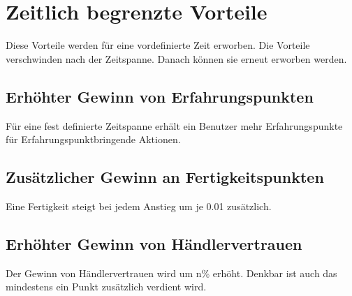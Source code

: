 \chapter{Zeitlich begrenzte Vorteile}
Diese Vorteile werden f{\"u}r eine vordefinierte Zeit erworben. Die Vorteile
verschwinden nach der Zeitspanne. Danach k{\"o}nnen sie erneut erworben werden.

\section {Erh{\"o}hter Gewinn von Erfahrungspunkten}
F{\"u}r eine fest definierte Zeitspanne erh{\"a}lt ein Benutzer mehr Erfahrungspunkte
f{\"u}r Erfahrungspunktbringende Aktionen.

\section {Zus{\"a}tzlicher Gewinn an Fertigkeitspunkten}
Eine Fertigkeit steigt bei jedem Anstieg um je 0.01 zus{\"a}tzlich.
 
\section {Erh{\"o}hter Gewinn von H{\"a}ndlervertrauen}
Der Gewinn von H{\"a}ndlervertrauen wird um n\% erh{\"o}ht. Denkbar ist auch
das mindestens ein Punkt zus{\"a}tzlich verdient wird.
